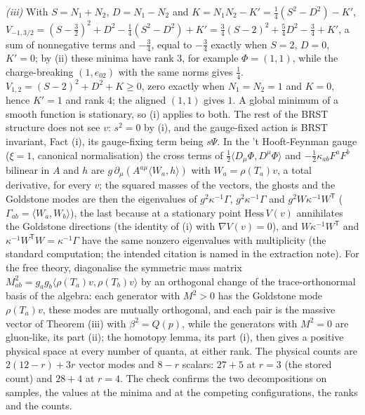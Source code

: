 \emph{(iii)} With $S = N_{1} + N_{2}$, $D = N_{1} - N_{2}$ and $K = N_{1}N_{2} - K' = \tfrac14(S^{2} - D^{2}) - K'$, $V_{-1, 3/2} = (S - \tfrac32)^{2} + D^{2} - \tfrac14(S^{2} - D^{2}) + K' = \tfrac34(S - 2)^{2} + \tfrac54D^{2} - \tfrac34 + K'$, a sum of nonnegative terms and $-\tfrac34$, equal to $-\tfrac34$ exactly when $S = 2$, $D = 0$, $K' = 0$; by (ii) these minima have rank $3$, for example $\Phi = (1, 1)$, while the charge-breaking $(1, e_{02})$ with the same norms gives $\tfrac14$. $V_{1, 2} = (S - 2)^{2} + D^{2} + K \ge 0$, zero exactly when $N_{1} = N_{2} = 1$ and $K = 0$, hence $K' = 1$ and rank $4$; the aligned $(1, 1)$ gives $1$. A global minimum of a smooth function is stationary, so (i) applies to both. The rest of the BRST structure does not see $v$: $s^{2} = 0$ by (i), and the gauge-fixed action is BRST invariant, Fact (i), its gauge-fixing term being $s\Psi$. In the 't Hooft-Feynman gauge ($\xi = 1$, canonical normalisation) the cross terms of $\tfrac12\langle D_{\mu}\Phi, D^{\mu}\Phi\rangle$ and $-\tfrac12\kappa_{ab}F^{a}F^{b}$ bilinear in $A$ and $h$ are $g\,\partial_{\mu}(A^{a\mu}\langle W_{a}, h\rangle)$ with $W_{a} = \rho(T_{a})v$, a total derivative, for every $v$; the squared masses of the vectors, the ghosts and the Goldstone modes are then the eigenvalues of $g^{2}\kappa^{-1}\Gamma$, $g^{2}\kappa^{-1}\Gamma$ and $g^{2}W\kappa^{-1}W^{\mathsf T}$ ($\Gamma_{ab} = \langle W_{a}, W_{b}\rangle$), the last because at a stationary point $\mathrm{Hess}\,V(v)$ annihilates the Goldstone directions (the identity of (i) with $\nabla V(v) = 0$), and $W\kappa^{-1}W^{\mathsf T}$ and $\kappa^{-1}W^{\mathsf T}W = \kappa^{-1}\Gamma$ have the same nonzero eigenvalues with multiplicity (the standard computation; the intended citation is named in the extraction note). For the free theory, diagonalise the symmetric mass matrix $M^{2}_{ab} = g_{a}g_{b}\langle\rho(T_{a})v, \rho(T_{b})v\rangle$ by an orthogonal change of the trace-orthonormal basis of the algebra: each generator with $M^{2} > 0$ has the Goldstone mode $\rho(T_{a})v$, these modes are mutually orthogonal, and each pair is the massive vector of Theorem (iii) with $\beta^{2} = Q(p)$, while the generators with $M^{2} = 0$ are gluon-like, its part (ii); the homotopy lemma, its part (i), then gives a positive physical space at every number of quanta, at either rank. The physical counts are $2(12 - r) + 3r$ vector modes and $8 - r$ scalars: $27 + 5$ at $r = 3$ (the stored count) and $28 + 4$ at $r = 4$. The check confirms the two decompositions on samples, the values at the minima and at the competing configurations, the ranks and the counts.

